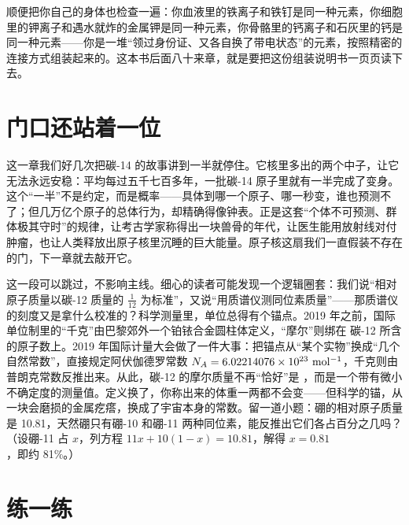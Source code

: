 顺便把你自己的身体也检查一遍：你血液里的铁离子和铁钉是同一种元素，你细胞里的钾离子和遇水就炸的金属钾是同一种元素，你骨骼里的钙离子和石灰里的钙是同一种元素——你是一堆“领过身份证、又各自换了带电状态”的元素，按照精密的连接方式组装起来的。这本书后面八十来章，就是要把这份组装说明书一页页读下去。

\section{门口还站着一位}

这一章我们好几次把碳-14 的故事讲到一半就停住。它核里多出的两个中子，让它无法永远安稳：平均每过五千七百多年，一批碳-14 原子里就有一半完成了变身。这个“一半”不是约定，而是概率——具体到哪一个原子、哪一秒变，谁也预测不了；但几万亿个原子的总体行为，却精确得像钟表。正是这套“个体不可预测、群体极其守时”的规律，让考古学家称得出一块兽骨的年代，让医生能用放射线对付肿瘤，也让人类释放出原子核里沉睡的巨大能量。原子核这扇我们一直假装不存在的门，下一章就去敲开它。

\begin{tiaozhan}
这一段可以跳过，不影响主线。细心的读者可能发现一个逻辑圈套：我们说“相对原子质量以碳-12 质量的 $\frac{1}{12}$ 为标准”，又说“用质谱仪测同位素质量”——那质谱仪的刻度又是拿什么校准的？科学测量里，单位总得有个锚点。2019 年之前，国际单位制里的“千克”由巴黎郊外一个铂铱合金圆柱体定义，“摩尔”则绑在  碳-12 所含的原子数上。2019 年国际计量大会做了一件大事：把锚点从“某个实物”换成“几个自然常数”，直接规定阿伏伽德罗常数 $N_A = 6.02214076\times 10^{23}\ \mathrm{mol^{-1}}$，千克则由普朗克常数反推出来。从此，碳-12 的摩尔质量不再“恰好”是 ，而是一个带有微小不确定度的测量值。定义换了，你称出来的体重一两都不会变——但科学的锚，从一块会磨损的金属疙瘩，换成了宇宙本身的常数。留一道小题：硼的相对原子质量是 10.81，天然硼只有硼-10 和硼-11 两种同位素，能反推出它们各占百分之几吗？（设硼-11 占 $x$，列方程 $11x+10(1-x)=10.81$，解得 $x=0.81$，即约 81\%。）
\end{tiaozhan}

\section*{练一练}


